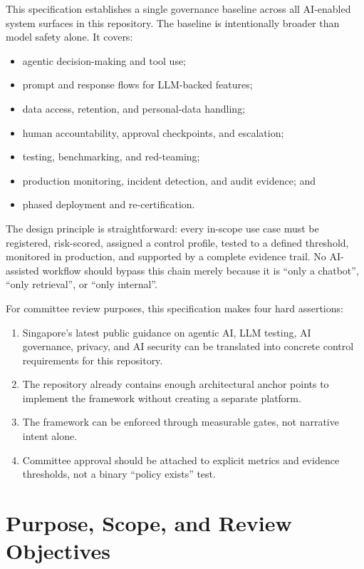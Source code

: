 \documentclass[11pt,a4paper]{article}
\begin{document}
This specification establishes a single governance baseline across all AI-enabled system surfaces in this repository. The baseline is intentionally broader than model safety alone. It covers:

\begin{itemize}[nosep]
    \item agentic decision-making and tool use;
    \item prompt and response flows for LLM-backed features;
    \item data access, retention, and personal-data handling;
    \item human accountability, approval checkpoints, and escalation;
    \item testing, benchmarking, and red-teaming;
    \item production monitoring, incident detection, and audit evidence; and
    \item phased deployment and re-certification.
\end{itemize}

The design principle is straightforward: every in-scope use case must be registered, risk-scored, assigned a control profile, tested to a defined threshold, monitored in production, and supported by a complete evidence trail. No AI-assisted workflow should bypass this chain merely because it is ``only a chatbot'', ``only retrieval'', or ``only internal''.

For committee review purposes, this specification makes four hard assertions:

\begin{enumerate}[nosep]
    \item Singapore's latest public guidance on agentic AI, LLM testing, AI governance, privacy, and AI security can be translated into concrete control requirements for this repository.
    \item The repository already contains enough architectural anchor points to implement the framework without creating a separate platform.
    \item The framework can be enforced through measurable gates, not narrative intent alone.
    \item Committee approval should be attached to explicit metrics and evidence thresholds, not a binary ``policy exists'' test.
\end{enumerate}

\section{Purpose, Scope, and Review Objectives}
\end{document}
